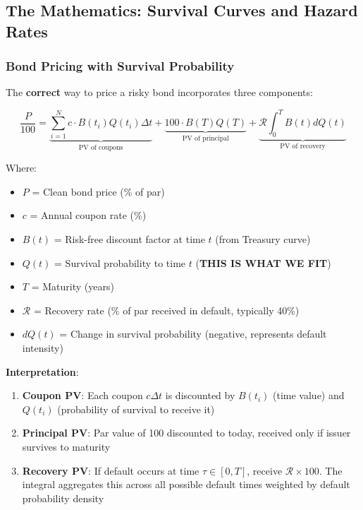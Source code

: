 \documentclass[11pt,a4paper]{article}
\begin{document}
\subsection{The Mathematics: Survival Curves and Hazard Rates}

\subsubsection{Bond Pricing with Survival Probability}

\begin{keybox}
The \textbf{correct} way to price a risky bond incorporates three components:

\begin{equation}
\frac{P}{100} = \underbrace{\sum_{i=1}^{N} c \cdot B(t_i)Q(t_i)\Delta t}_{\text{PV of coupons}} + \underbrace{100 \cdot B(T)Q(T)}_{\text{PV of principal}} + \underbrace{\mathcal{R} \int_0^T B(t)dQ(t)}_{\text{PV of recovery}}
\end{equation}

Where:
\begin{itemize}
    \item $P$ = Clean bond price (\% of par)
    \item $c$ = Annual coupon rate (\%)
    \item $B(t)$ = Risk-free discount factor at time $t$ (from Treasury curve)
    \item $Q(t)$ = Survival probability to time $t$ (\textbf{THIS IS WHAT WE FIT})
    \item $T$ = Maturity (years)
    \item $\mathcal{R}$ = Recovery rate (\% of par received in default, typically 40\%)
    \item $dQ(t)$ = Change in survival probability (negative, represents default intensity)
\end{itemize}

\textbf{Interpretation}:
\begin{enumerate}
    \item \textbf{Coupon PV}: Each coupon $c\Delta t$ is discounted by $B(t_i)$ (time value) and $Q(t_i)$ (probability of survival to receive it)
    \item \textbf{Principal PV}: Par value of 100 discounted to today, received only if issuer survives to maturity
    \item \textbf{Recovery PV}: If default occurs at time $\tau \in [0,T]$, receive $\mathcal{R} \times 100$. The integral aggregates this across all possible default times weighted by default probability density
\end{enumerate}
\end{keybox}
\end{document}
